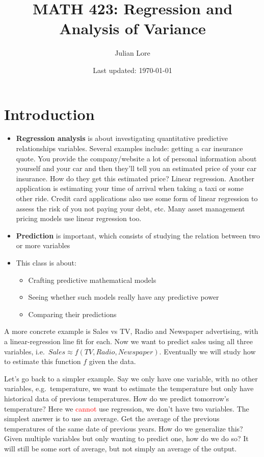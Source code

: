 \documentclass[12 pt]{article}
\author{Julian Lore}
\date{Last updated: \today}
\title{MATH 423: Regression and Analysis of Variance}
\begin{document}
\onehalfspacing
\maketitle
\tableofcontents
\section{Introduction}
\begin{itemize}
\item
\textbf{Regression analysis} is about investigating quantitative predictive
relationships variables. Several examples include: getting a car insurance quote. You
provide the company/website a lot of personal information about
yourself and your car and then they'll tell you an estimated price of
your car insurance. How do they get this estimated price? Linear
regression. Another application is estimating your time of arrival
when taking a taxi or some other ride. Credit card applications also
use some form of linear regression to assess the risk of you not
paying your debt, etc. Many asset management pricing models use linear
regression too.
\item
  \textbf{Prediction} is important, which consists of studying the
  relation between two or more variables
\item This class is about:
  \begin{itemize}
  \item Crafting predictive mathematical models
  \item Seeing whether such models really have any predictive power
  \item Comparing their predictions
  \end{itemize}
\end{itemize}
A more concrete example is Sales vs TV, Radio and Newspaper
advertising, with a linear-regression line fit for each. Now we want
to predict sales using all three variables, i.e.\ $Sales \approx
f(TV,Radio,Newspaper)$. Eventually we will study how to estimate this
function $f$ given the data.

Let's go back to a simpler example. Say we only have one variable,
with no other variables, e.g.\ temperature, we want to estimate the
temperature but only have historical data of previous
temperatures. How do we predict tomorrow's temperature? Here we
\textcolor{red}{cannot} use regression, we don't have two
variables. The simplest answer is to use an average. Get the average
of the previous temperatures of the same date of previous years. How
do we generalize this? Given multiple variables but only wanting to
predict one, how do we do so? It will still be some sort of average,
but not simply an average of the output.
\end{document}
